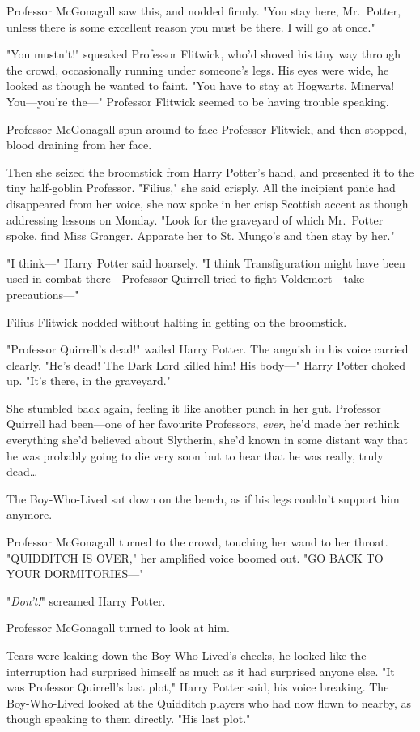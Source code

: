 Professor McGonagall saw this, and nodded firmly. "You stay here, Mr.~Potter,
unless there is some excellent reason you must be there. I will go at once."

"You mustn't!" squeaked Professor Flitwick, who'd shoved his tiny way through
the crowd, occasionally running under someone's legs. His eyes were wide, he
looked as though he wanted to faint. "You have to stay at Hogwarts, Minerva!
You---you're the---" Professor Flitwick seemed to be having trouble speaking.

Professor McGonagall spun around to face Professor Flitwick, and then stopped,
blood draining from her face.

Then she seized the broomstick from Harry Potter's hand, and presented it to
the tiny half-goblin Professor. "Filius," she said crisply. All the incipient
panic had disappeared from her voice, she now spoke in her crisp Scottish
accent as though addressing lessons on Monday. "Look for the graveyard of which
Mr.~Potter spoke, find Miss Granger. Apparate her to St. Mungo's and then stay
by her."

"I think---" Harry Potter said hoarsely. "I think Transfiguration might have
been used in combat there---Professor Quirrell tried to fight Voldemort---take
precautions---"

Filius Flitwick nodded without halting in getting on the broomstick.

"Professor Quirrell's dead!" wailed Harry Potter. The anguish in his voice
carried clearly. "He's dead! The Dark Lord killed him! His body---" Harry
Potter choked up. "It's there, in the graveyard."

She stumbled back again, feeling it like another punch in her gut. Professor
Quirrell had been---one of her favourite Professors, \emph{ever}, he'd made her
rethink everything she'd believed about Slytherin, she'd known in some distant
way that he was probably going to die very soon but to hear that he was really,
truly dead{\ldots}

The Boy-Who-Lived sat down on the bench, as if his legs couldn't support him
anymore.

Professor McGonagall turned to the crowd, touching her wand to her throat.
"QUIDDITCH IS OVER," her amplified voice boomed out. "GO BACK TO YOUR
DORMITORIES---"

"\emph{Don't!}" screamed Harry Potter.

Professor McGonagall turned to look at him.

Tears were leaking down the Boy-Who-Lived's cheeks, he looked like the
interruption had surprised himself as much as it had surprised anyone else. "It
was Professor Quirrell's last plot," Harry Potter said, his voice breaking. The
Boy-Who-Lived looked at the Quidditch players who had now flown to nearby, as
though speaking to them directly. "His last plot."

